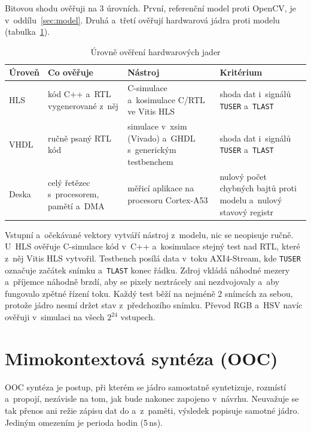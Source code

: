 Bitovou shodu ověřuji na 3 úrovních. První, referenční model proti OpenCV, je v~oddílu~\ref{sec:model}. Druhá a~třetí ověřují hardwarová jádra proti modelu (tabulka~\ref{tab:urovne}).

\begin{table}[htbp]
    \centering
    \caption{Úrovně ověření hardwarových jader}
    \label{tab:urovne}
    \begin{tabular}{p{2.4cm}p{3.6cm}p{3.4cm}p{3.7cm}}
        \toprule
        Úroveň & Co ověřuje & Nástroj & Kritérium \\
        \midrule
        HLS & kód C++ a~RTL vygenerované z~něj & C-simulace a~kosimulace C/RTL ve Vitis HLS & shoda dat i~signálů \texttt{TUSER} a~\texttt{TLAST} \\
        VHDL & ručně psaný RTL kód & simulace v~xsim (Vivado) a~GHDL s~generickým testbenchem & shoda dat i~signálů \texttt{TUSER} a~\texttt{TLAST} \\
        Deska & celý řetězec s~procesorem, pamětí a~DMA & měřicí aplikace na procesoru Cortex-A53 & nulový počet chybných bajtů proti modelu a~nulový stavový registr \\
        \bottomrule
    \end{tabular}
\end{table}

Vstupní a~očekávané vektory vytváří nástroj z~modelu, nic se neopisuje ručně. U~HLS ověřuje C-simulace kód v~C++ a~kosimulace stejný test nad RTL, které z~něj Vitis HLS vytvořil. Testbench posílá data v~toku \acs{AXI}4-Stream, kde \texttt{TUSER} označuje začátek snímku a~\texttt{TLAST} konec řádku. Zdroj vkládá náhodné mezery a~příjemce náhodně brzdí, aby se pixely neztrácely ani nezdvojovaly a~aby fungovalo zpětné řízení toku. Každý test běží na nejméně 2 snímcích za sebou, protože jádro nesmí držet stav z~předchozího snímku. Převod RGB a~HSV navíc ověřuji v~simulaci na všech $2^{24}$ vstupech.

\section{Mimokontextová syntéza (OOC)}
\label{sec:ooc}


OOC syntéza je postup, při kterém se jádro samostatně syntetizuje, rozmístí a~propojí, nezávisle na tom, jak bude nakonec zapojeno v~návrhu. Neuvažuje se tak přenos ani režie zápisu dat do a~z~paměti, výsledek popisuje samotné jádro. Jediným omezením je perioda hodin (5\,ns).


